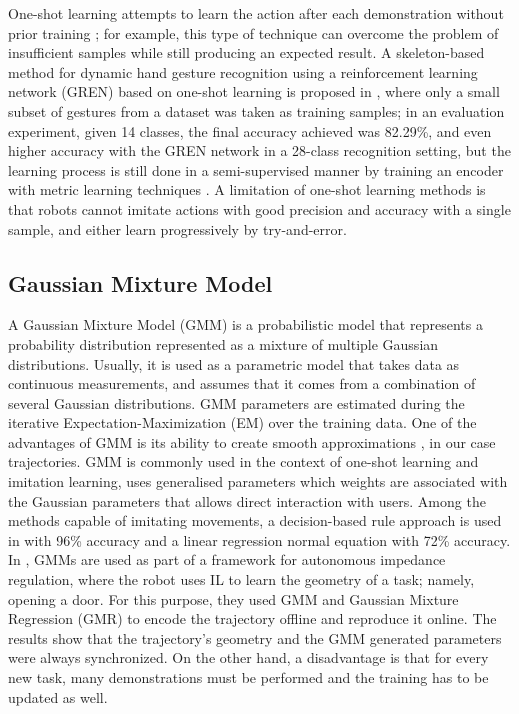 \documentclass[thesis]{mas_proposal}
\begin{document}
		One-shot learning attempts to learn the action after each demonstration without prior training \cite{Yan2010}; for example, this type of technique can overcome the problem of insufficient samples while still producing an expected result. A skeleton-based method for dynamic hand gesture recognition using a reinforcement learning network (GREN) based on one-shot learning is proposed in \cite{Chunyong2020}, where only a small subset of gestures from a dataset was taken as training samples; in an evaluation experiment, given 14 classes, the final accuracy achieved was 82.29\%, and even higher accuracy with the GREN network in a 28-class recognition setting, but the learning process is still done in a semi-supervised manner by training an encoder with metric learning techniques \cite{Sabater2021}. A limitation of one-shot learning methods is that robots cannot imitate actions with good precision and accuracy with a single sample, and either learn progressively by try-and-error.
		
	\subsection{Gaussian Mixture Model}
	
		A Gaussian Mixture Model (GMM) is a probabilistic model that represents a probability distribution represented as a mixture of multiple Gaussian distributions. Usually, it is used as a parametric model that takes data as continuous measurements, and assumes that it comes from a combination of several Gaussian distributions. GMM parameters are estimated during the iterative Expectation-Maximization (EM) over the training data. One of the advantages of GMM is its ability to create smooth approximations \cite{Reynolds2009}, in our case trajectories. GMM is commonly used in the context of one-shot learning and imitation learning, uses generalised parameters which weights are associated with the Gaussian parameters that allows direct interaction with users. Among the methods capable of imitating movements, a decision-based rule approach is used in \cite{Itauma2012} with 96\% accuracy and a linear regression normal equation with 72\% accuracy. In \cite{Wu2020}, GMMs are used as part of a framework for autonomous impedance regulation, where the robot uses IL to learn the geometry of a task; namely, opening a door. For this purpose, they used GMM and Gaussian Mixture Regression (GMR) to encode the trajectory offline and reproduce it online. The results show that the trajectory's geometry and the GMM generated parameters were always synchronized. On the other hand, a disadvantage is that for every new task, many demonstrations must be performed and the training has to be updated as well.
		
\end{document}
